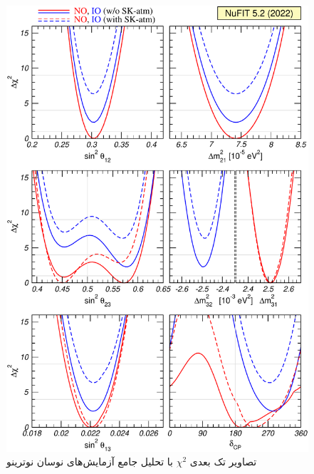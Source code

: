 \documentclass[a4paper]{book}
\begin{document}
\begin{figure}
	\centering
	\includegraphics[width=\textwidth]{./fig-chisq-glob}
	\caption{تصاویر تک بعدی $\chi^2$ با تحلیل جامع آزمایش‌های نوسان نوترینو}
	\label{fig:NuFIT}
\end{figure}
\end{document}
